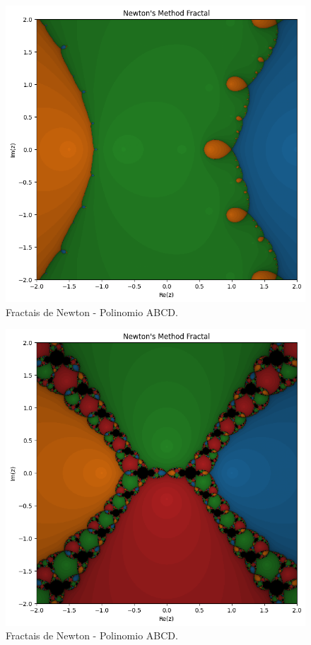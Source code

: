 \begin{figure}[H]
    \centering
    \includegraphics[width=1\textwidth]{Imagens/nr2d_fractals/polinomials/nrfractal_polinomio3.png}
    \caption{Fractais de Newton - Polinomio ABCD.}
    \label{fig:fractaisnr_polinomials1}
\end{figure}

\begin{figure}[H]
    \centering
    \includegraphics[width=1\textwidth]{Imagens/nr2d_fractals/polinomials/nrfractal_polinomio4.png}
    \caption{Fractais de Newton - Polinomio ABCD.}
    \label{fig:fractaisnr_polinomials1}
\end{figure}



